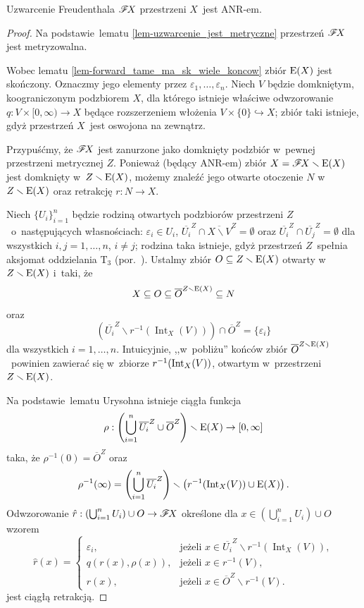 \begin{lem}\label{lem-osw_nap_ANR}
Uzwarcenie Freudenthala $\mathscr{F}\! X$ przestrzeni $X$~jest \mbox{ANR-em}.
\end{lem}
\begin{proof}
Na podstawie~lematu \ref{lem-uzwarcenie_jest_metryczne} przestrzeń $\mathscr{F}\! X$ jest metryzowalna.

Wobec lematu \ref{lem-forward_tame_ma_sk_wiele_koncow} zbiór $\mathrm{E}(X)$ jest skończony. Oznaczmy jego elementy przez $\varepsilon_1,\ldots,\varepsilon_n$. Niech $V$ będzie domkniętym, koograniczonym podzbiorem $X$, dla którego istnieje właściwe odwzorowanie $q:V\times [0,\infty)\to X$ będące rozszerzeniem włożenia $V\times \{0\}\hookrightarrow X$; zbiór taki istnieje, gdyż przestrzeń $X$~jest oswojona na zewnątrz.

Przypuśćmy, że $\mathscr{F}\! X$ jest zanurzone jako domknięty podzbiór w~pewnej przestrzeni metrycznej $Z$. Ponieważ (będący \mbox{ANR-em}) zbiór $X=\mathscr{F}\! X\smallsetminus \mathrm{E}(X)$ jest domknięty w~$Z\smallsetminus \mathrm{E}(X)$, możemy znaleźć jego otwarte otoczenie $N$ w~$Z\smallsetminus \mathrm{E}(X)$ oraz retrakcję $r\colon N\to X$.

Niech $\{U_i\}_{i=1}^n$ będzie rodziną otwartych podzbiorów przestrzeni $Z$~o~następujących własnościach: $\varepsilon_i\in U_i$, $\overline{U_i}^Z\cap \overline{X\smallsetminus V}^Z=\emptyset$ oraz $\overline{U_i}^Z\cap\overline{U_j}^Z=\emptyset$ dla wszystkich $i,j=1,\ldots,n$, $i\not=j$; rodzina taka istnieje, gdyż przestrzeń $Z$~spełnia aksjomat oddzielania $\mathrm{T}_3$ (por.~\cite[Twierdzenie 1.5.5]{Engelking75}). Ustalmy zbiór $O\subseteq Z\smallsetminus \mathrm{E}(X)$ otwarty w~$Z\smallsetminus\mathrm{E}(X)$ i~taki, że \[X\subseteq O\subseteq \overline{O}^{Z\smallsetminus \mathrm{E}(X)}\subseteq N\] oraz \[\left(\overline{U_i}^Z\smallsetminus r^{-1}(\operatorname{Int}_X(V))\right)\cap \overline{O}^Z=\{\varepsilon_i\}\] dla wszystkich $i=1,\ldots,n$. Intuicyjnie, ,,w~pobliżu'' końców zbiór $\overline{O}^{Z\smallsetminus \mathrm{E}(X)}$~powinien zawierać się w~zbiorze $r^{-1}(\operatorname{Int}_X(V))$, otwartym w~przestrzeni $Z\smallsetminus \mathrm{E}(X)$.

Na podstawie~lematu Urysohna istnieje ciągła funkcja \[\rho:\left(\bigcup_{i=1}^n \overline{U_i}^Z\cup \overline{O}^Z\right)\smallsetminus \mathrm{E}(X)\to [0,\infty]\] taka, że $\rho^{-1}(0)=\overline{O}^Z$ oraz \[\rho^{-1}(\infty)=\left(\bigcup_{i=1}^n \overline{U_i}^Z\right)\smallsetminus \left(r^{-1}(\operatorname{Int}_X(V))\cup \mathrm{E}(X)\right).\] Odwzorowanie $\hat{r}:\left(\bigcup_{i=1}^{n} U_i\right)\cup O\to \mathscr{F}\! X$ określone dla $x\in\left(\bigcup_{i=1}^{n} U_i\right)\cup O$ wzorem
\[\hat{r}(x)=\begin{cases}\varepsilon_i, & \text{jeżeli } x\in \overline{U_i}^Z\smallsetminus r^{-1}(\operatorname{Int}_X(V)),\\
q(r(x),\rho(x)), & \text{jeżeli } x\in r^{-1}(V),\\
r(x), & \text{jeżeli } x\in \overline{O}^Z\smallsetminus r^{-1}(V).
\end{cases}\]
jest ciągłą retrakcją.
\end{proof}

